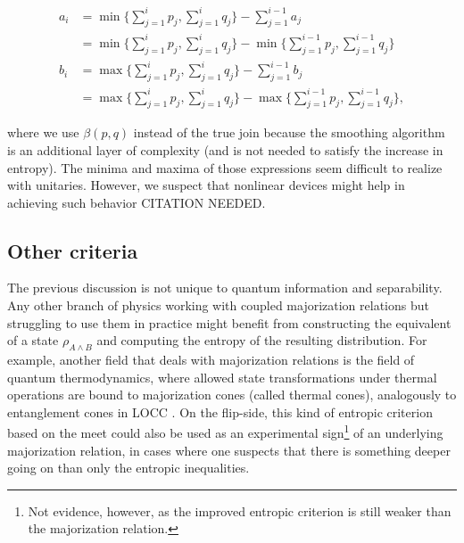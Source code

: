 \begin{align}
    a_i &= \min \Big\{ \sum_{j=1}^{i} p_j , \sum_{j=1}^{i} q_j \Big\} - \sum_{j=1}^{i-1} a_j\\
    &= \min \Big\{ \sum_{j=1}^{i} p_j , \sum_{j=1}^{i} q_j \Big\} - \min \Big\{ \sum_{j=1}^{i-1} p_j , \sum_{j=1}^{i-1} q_j \Big\}\\
    b_i &= \max \Big\{ \sum_{j=1}^{i} p_j , \sum_{j=1}^{i} q_j \Big\} - \sum_{j=1}^{i-1} b_j\\
    &= \max \Big\{ \sum_{j=1}^{i} p_j , \sum_{j=1}^{i} q_j \Big\} - \max \Big\{ \sum_{j=1}^{i-1} p_j , \sum_{j=1}^{i-1} q_j \Big\},
\end{align}

\noindent where we use $\beta(p, q)$ instead of the true join because the smoothing algorithm is an additional layer of complexity (and is not needed to satisfy the increase in entropy). The minima and maxima of those expressions seem difficult to realize with unitaries. However, we suspect that nonlinear devices might help in achieving such behavior CITATION NEEDED.


\subsection{Other criteria}

The previous discussion is not unique to quantum information and separability. Any other branch of physics working with coupled majorization relations but struggling to use them in practice might benefit from constructing the equivalent of a state $\rho_{A \wedge B}$ and computing the entropy of the resulting distribution. For example, another field that deals with majorization relations is the field of quantum thermodynamics, where allowed state transformations under thermal operations are bound to majorization cones (called thermal cones), analogously to entanglement cones in LOCC \cite{korzekwa_structure_2017, junior_geometric_2022}. On the flip-side, this kind of entropic criterion based on the meet could also be used as an experimental sign\footnote{Not evidence, however, as the improved entropic criterion is still weaker than the majorization relation.} of an underlying majorization relation, in cases where one suspects that there is something deeper going on than only the entropic inequalities.


